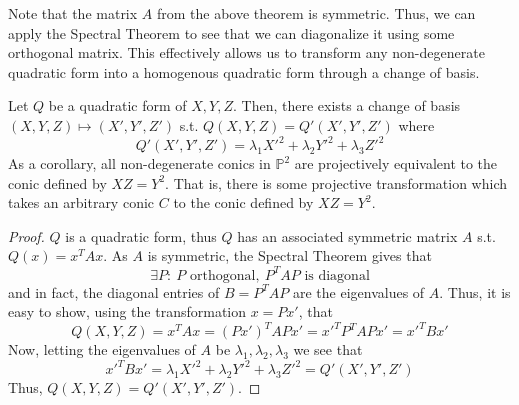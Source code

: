 Note that the matrix $A$ from the above theorem is symmetric. Thus, we can
apply the Spectral Theorem to see that we can diagonalize it using some
orthogonal matrix. This effectively allows us to transform any non-degenerate 
quadratic form into a homogenous quadratic form through a change of basis.

\begin{theorem}
Let $Q$ be a quadratic form of $X, Y, Z$. Then, there exists a change of basis $(X,Y,Z) \mapsto (X',Y',Z')$ s.t.
$Q(X,Y,Z) = Q'(X',Y',Z')$ where
\[
Q'(X',Y',Z') = \lambda_1 X'^2 + \lambda_2 Y'^2 + \lambda_3 Z'^2
\]
As a corollary, all non-degenerate conics in $\mathbb{P}^2$ are projectively
equivalent to the conic defined by $XZ = Y^2$. That is, there is some
projective transformation which takes an arbitrary conic $C$ to the conic 
defined by $XZ = Y^2$.
\end{theorem}
\begin{proof}
$Q$ is a quadratic form,
thus $Q$ has an associated symmetric matrix 
$A$ s.t. $Q(x) = x^TAx$. As $A$ is symmetric, the Spectral Theorem gives that
\[
\exists P:~P\text{ orthogonal},~P^TAP\text{ is diagonal}
\]
and in fact, the diagonal entries of $B=P^TAP$ are the eigenvalues of $A$. Thus,
it is easy to show, using the transformation $x=Px'$, that
\[
Q(X,Y,Z) = x^TAx = (Px')^TAPx' = x'^TP^TAPx' = x'^TBx'
\]
Now, letting the eigenvalues of $A$ be $\lambda_1, \lambda_2, \lambda_3$ we see that
\[
x'^TBx' = \lambda_1 X'^2 + \lambda_2 Y'^2 + \lambda_3 Z'^2 = Q'(X',Y',Z')
\]
Thus, $Q(X,Y,Z) = Q'(X',Y',Z')$.
\end{proof}

